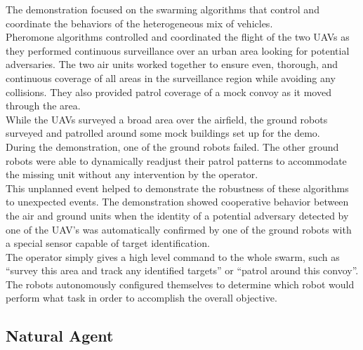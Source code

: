 The demonstration focused on the swarming algorithms that control and coordinate the behaviors of the heterogeneous mix of vehicles.\\
Pheromone  algorithms  controlled  and  coordinated  the  flight  of  the  two  UAVs  as  they performed continuous  surveillance  over  an  urban  area  looking  for  potential  adversaries. The  two  air  units worked together to ensure even, thorough, and continuous coverage of all areas in the surveillance region  while  avoiding  any  collisions. They  also  provided  patrol coverage  of  a  mock  convoy  as  it moved through the area.\\ 
While the UAVs surveyed a broad area over the airfield, the ground robots surveyed and patrolled around  some  mock  buildings  set  up  for  the  demo.\\
During  the  demonstration,  one  of  the  ground robots  failed. The  other  ground  robots were  able  to  dynamically  readjust  their  patrol  patterns to accommodate  the  missing  unit without  any  intervention  by  the  operator.\\
This  unplanned  event helped to demonstrate the robustness of these algorithms to unexpected events. The  demonstration  showed  cooperative  behavior  between  the  air  and  ground  units when  the identity of a potential adversary detected by one of the UAV’s was automatically confirmed by one of the ground robots with a special sensor capable of target identification.\\
The operator simply gives a high level command to the whole swarm, such as “survey this area and track  any  identified  targets”  or  “patrol  around  this  convoy”.\\
The  robots  autonomously  configured themselves to determine which robot would perform what task in order to accomplish the overall objective.

\newpage

\subsection{Natural Agent}

